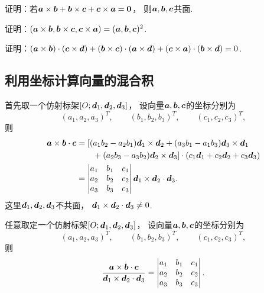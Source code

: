 \begin{example}
证明：若\(\boldsymbol{a}\times\boldsymbol{b}
+ \boldsymbol{b}\times\boldsymbol{c}
+ \boldsymbol{c}\times\boldsymbol{a}
= \boldsymbol{0}\)，
则\(\boldsymbol{a},\boldsymbol{b},\boldsymbol{c}\)共面.
\end{example}

\begin{example}
证明：\((\boldsymbol{a}\times\boldsymbol{b},\boldsymbol{b}\times\boldsymbol{c},\boldsymbol{c}\times\boldsymbol{a})
= (\boldsymbol{a},\boldsymbol{b},\boldsymbol{c})^2\).
\end{example}

\begin{example}
证明：\((\boldsymbol{a}\times\boldsymbol{b})\cdot(\boldsymbol{c}\times\boldsymbol{d})
+ (\boldsymbol{b}\times\boldsymbol{c})\cdot(\boldsymbol{a}\times\boldsymbol{d})
+ (\boldsymbol{c}\times\boldsymbol{a})\cdot(\boldsymbol{b}\times\boldsymbol{d})
= 0\).
\end{example}

\subsection{利用坐标计算向量的混合积}
首先取一个仿射标架\([O;\boldsymbol{d}_1,\boldsymbol{d}_2,\boldsymbol{d}_3]\)，
设向量\(\boldsymbol{a},\boldsymbol{b},\boldsymbol{c}\)的坐标分别为\[
	(a_1,a_2,a_3)^T, \qquad
	(b_1,b_2,b_3)^T, \qquad
	(c_1,c_2,c_3)^T,
\]
则\begin{equation}
\begin{split}
	\boldsymbol{a}\times\boldsymbol{b}\cdot\boldsymbol{c}
	&= [(a_1 b_2 - a_2 b_1) \boldsymbol{d}_1 \times \boldsymbol{d}_2
	+ (a_3 b_1 - a_1 b_3) \boldsymbol{d}_3 \times \boldsymbol{d}_1 \\
	&\hspace{20pt}
	+ (a_2 b_3 - a_3 b_2) \boldsymbol{d}_2 \times \boldsymbol{d}_3]
	\cdot (c_1 \boldsymbol{d}_1 + c_2 \boldsymbol{d}_2 + c_3 \boldsymbol{d}_3) \\
	&= \begin{vmatrix}
		a_1 & b_1 & c_1 \\
		a_2 & b_2 & c_2 \\
		a_3 & b_3 & c_3
	\end{vmatrix}
	\boldsymbol{d}_1 \times \boldsymbol{d}_2 \cdot \boldsymbol{d}_3.
\end{split}
\end{equation}
这里\(\boldsymbol{d}_1,\boldsymbol{d}_2,\boldsymbol{d}_3\)不共面，
\(\boldsymbol{d}_1\times\boldsymbol{d}_2\cdot\boldsymbol{d}_3\neq0\).

\begin{theorem}
任意取定一个仿射标架\([O;\boldsymbol{d}_1,\boldsymbol{d}_2,\boldsymbol{d}_3]\)，
设向量\(\boldsymbol{a},\boldsymbol{b},\boldsymbol{c}\)的坐标分别为\[
	(a_1,a_2,a_3)^T, \qquad
	(b_1,b_2,b_3)^T, \qquad
	(c_1,c_2,c_3)^T,
\]
则\begin{equation}
	\frac{\boldsymbol{a}\times\boldsymbol{b}\cdot\boldsymbol{c}}{\boldsymbol{d}_1\times\boldsymbol{d}_2\cdot\boldsymbol{d}_3}
	= \begin{vmatrix}
		a_1 & b_1 & c_1 \\
		a_2 & b_2 & c_2 \\
		a_3 & b_3 & c_3
	\end{vmatrix}.
\end{equation}
\end{theorem}

